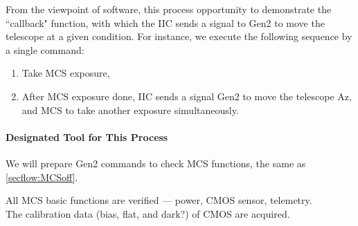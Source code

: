 From the viewpoint of software, this process opportunity  to demonstrate the ``callback" function, with which the IIC sends a signal to Gen2 to move the telescope at a given condition.
For instance, we execute the following sequence by a single command:
\begin{enumerate}
\item Take MCS exposure,
\item After MCS exposure done, IIC sends a signal Gen2 to move the telescope Az, and MCS to take another exposure simultaneously.
\end{enumerate}



\paragraph{Designated Tool for This Process}
We will prepare Gen2 commands to check MCS functions, the same as \ref{secflow:MCSoff}.



\begin{itembox}[l]{}
All MCS basic functions are verified --- power, CMOS sensor, telemetry.  \\
The calibration data (bias, flat, and dark?) of CMOS are acquired.

\end{itembox}

